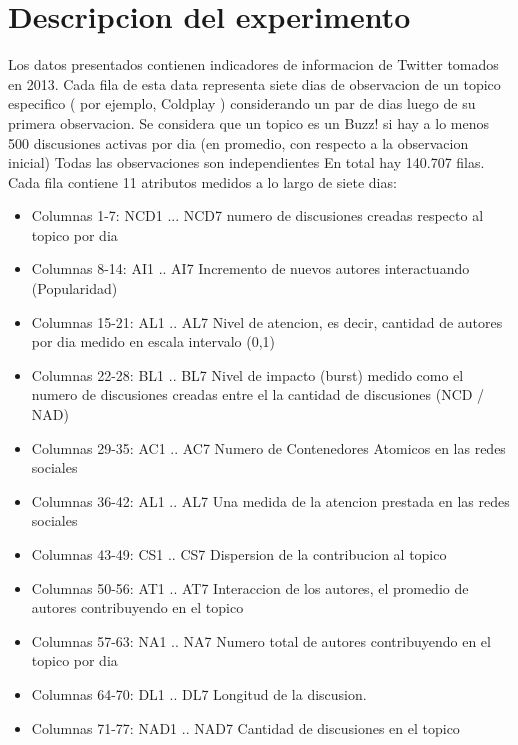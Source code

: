 \section{Descripcion del experimento}

Los datos presentados contienen indicadores de informacion de
Twitter tomados en 2013.
Cada fila de esta data representa siete dias de observacion de un
topico especifico
( por ejemplo, Coldplay ) considerando un par de dias luego de su
primera
observacion.
Se considera que un topico es un Buzz! si hay a lo menos 500
discusiones
activas por dia (en promedio, con respecto a la observacion inicial)
Todas las observaciones son independientes
En total hay 140.707 filas.
Cada fila contiene 11 atributos medidos a lo largo de siete dias:
\begin{itemize}
  \item{Columnas 1-7: NCD1 ... NCD7 numero de discusiones creadas
respecto al topico por dia}
  \item{Columnas 8-14: AI1 .. AI7 Incremento de nuevos autores
interactuando (Popularidad)}
  \item{Columnas 15-21: AL1 .. AL7 Nivel de atencion, es decir, cantidad
de autores por dia medido en escala intervalo (0,1)}
  \item{Columnas 22-28: BL1 .. BL7 Nivel de impacto (burst) medido como
el numero de discusiones creadas entre el la cantidad de discusiones  (NCD
/ NAD)}
  \item{Columnas 29-35: AC1 .. AC7 Numero de Contenedores Atomicos en las
redes sociales}
  \item{Columnas 36-42: AL1 .. AL7 Una medida de la atencion prestada en
las redes sociales}
  \item{Columnas 43-49: CS1 .. CS7 Dispersion de la contribucion al
topico}
  \item{Columnas 50-56: AT1 .. AT7 Interaccion de los autores, el
promedio de autores contribuyendo en el topico}
  \item{Columnas 57-63: NA1 .. NA7  Numero total de autores contribuyendo
en el topico por dia}
  \item{Columnas 64-70: DL1 .. DL7  Longitud de la discusion.}
  \item{Columnas 71-77: NAD1 .. NAD7 Cantidad de discusiones en el topico}
\end{itemize}
